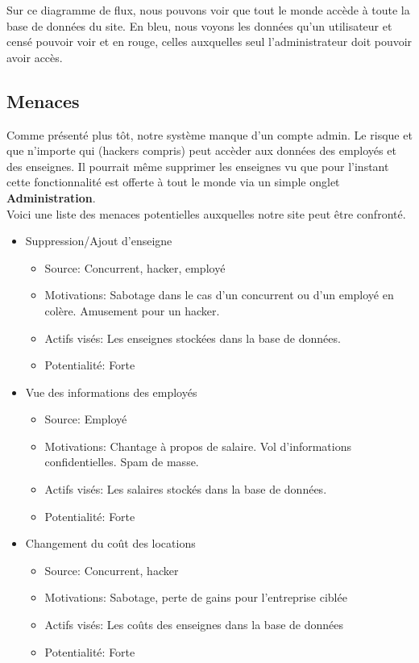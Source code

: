 \documentclass[a4paper]{article}
\begin{document}
Sur ce diagramme de flux, nous pouvons voir que tout le monde accède à toute la base de données du site. En bleu, nous voyons les données qu'un utilisateur et censé pouvoir voir et en rouge, celles auxquelles seul l'administrateur doit pouvoir avoir accès.

\subsection{Menaces}
Comme présenté plus tôt, notre système manque d'un compte admin. Le risque et que n'importe qui (hackers compris) peut accèder aux données des employés et des enseignes. Il pourrait même supprimer les enseignes vu que pour l'instant cette fonctionnalité est offerte à tout le monde via un simple onglet \textbf{Administration}.\\
Voici une liste des menaces potentielles auxquelles notre site peut être confronté.
\begin{itemize}

\item Suppression/Ajout d'enseigne
\begin{itemize}
\item Source: Concurrent, hacker, employé
\item Motivations: Sabotage dans le cas d'un concurrent ou d'un employé en colère. Amusement pour un hacker.
\item Actifs visés: Les enseignes stockées dans la base de données.
\item Potentialité: Forte
\end{itemize}

\item Vue des informations des employés
\begin{itemize}
\item Source:  Employé
\item Motivations: Chantage à propos de salaire. Vol d'informations confidentielles. Spam de masse.
\item Actifs visés: Les salaires stockés dans la base de données.
\item Potentialité: Forte
\end{itemize}

\item Changement du coût des locations
\begin{itemize}
\item Source: Concurrent, hacker
\item Motivations: Sabotage, perte de gains pour l'entreprise ciblée
\item Actifs visés: Les coûts des enseignes dans la base de données
\item Potentialité: Forte
\end{itemize}

\end{itemize}
\end{document}
